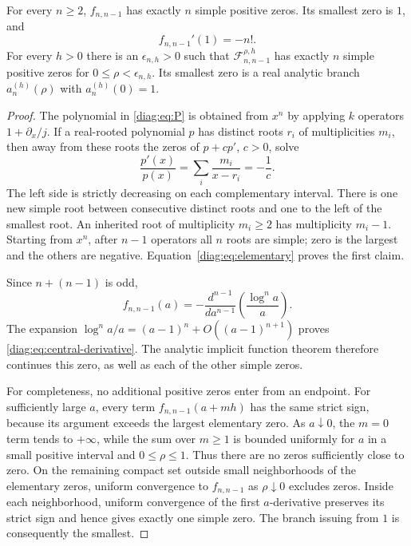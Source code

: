 \begin{lemma}\label{diag:lem:central}
For every $n\geq2$, $f_{n,n-1}$ has exactly $n$ simple positive zeros.
Its smallest zero is $1$, and
\begin{equation}\label{diag:eq:central-derivative}
 f_{n,n-1}'(1)=-n!.
\end{equation}
For every $h>0$ there is an $\epsilon_{n,h}>0$ such that
$\mathscr F_{n,n-1}^{\rho,h}$ has exactly $n$ simple positive zeros for
$0\leq\rho<\epsilon_{n,h}$.  Its smallest zero is a real analytic branch
$a_n^{(h)}(\rho)$ with $a_n^{(h)}(0)=1$.
\end{lemma}

\begin{proof}
The polynomial in \eqref{diag:eq:P} is obtained from $x^n$ by applying
$k$ operators $1+\partial_x/j$.  If a real-rooted polynomial $p$ has
distinct roots $r_i$ of multiplicities $m_i$, then away from these roots
the zeros of $p+cp'$, $c>0$, solve
\[
 \frac{p'(x)}{p(x)}=\sum_i\frac{m_i}{x-r_i}=-\frac1c.
\]
The left side is strictly decreasing on each complementary interval.
There is one new simple root between consecutive distinct roots and one
to the left of the smallest root.  An inherited root of multiplicity
$m_i\geq2$ has multiplicity $m_i-1$.  Starting from $x^n$, after $n-1$
operators all $n$ roots are simple; zero is the largest and the others
are negative.  Equation~\eqref{diag:eq:elementary} proves the first claim.

Since $n+(n-1)$ is odd,
\[
 f_{n,n-1}(a)=-\frac{d^{n-1}}{da^{n-1}}
                       \left(\frac{\log^n a}{a}\right).
\]
The expansion $\log^n a/a=(a-1)^n+O((a-1)^{n+1})$ proves
\eqref{diag:eq:central-derivative}.  The analytic implicit function theorem
therefore continues this zero, as well as each of the other simple zeros.

For completeness, no additional positive zeros enter from an endpoint.
For sufficiently large $a$, every term $f_{n,n-1}(a+mh)$ has the same
strict sign, because its argument exceeds the largest elementary zero.
As $a\downarrow0$, the $m=0$ term tends to $+\infty$, while the sum over
$m\geq1$ is bounded uniformly for $a$ in a small positive interval and
$0\leq\rho\leq1$.  Thus there are no zeros sufficiently close to zero.
On the remaining compact set outside small neighborhoods of the elementary
zeros, uniform convergence to $f_{n,n-1}$ as $\rho\downarrow0$ excludes
zeros.  Inside each neighborhood, uniform convergence of the first
$a$-derivative preserves its strict sign and hence gives exactly one
simple zero.  The branch issuing from $1$ is consequently the smallest.
\end{proof}


